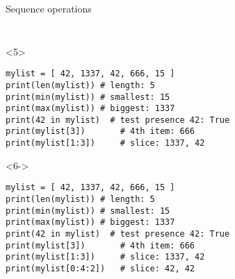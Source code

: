 \begin{frame}[fragile]{Sequence operations}
\begin{center}
\begin{columns}[onlytextwidth]
\begin{column}{\textwidth}
\begin{onlyenv}
\begin{lstlisting}[style=python,morekeywords={for, in, range, list}]
 \end{lstlisting}
      \end{onlyenv}

      \begin{onlyenv}<5>
        \begin{lstlisting}[style=python,morekeywords={for, in, range, list}]
mylist = [ 42, 1337, 42, 666, 15 ]
print(len(mylist)) # length: 5
print(min(mylist)) # smallest: 15
print(max(mylist)) # biggest: 1337
print(42 in mylist)  # test presence 42: True
print(mylist[3])       # 4th item: 666
print(mylist[1:3])     # slice: 1337, 42
 \end{lstlisting}
      \end{onlyenv}

      \begin{onlyenv}<6->
        \begin{lstlisting}[style=python,morekeywords={for, in, range, list}]
mylist = [ 42, 1337, 42, 666, 15 ]
print(len(mylist)) # length: 5
print(min(mylist)) # smallest: 15
print(max(mylist)) # biggest: 1337
print(42 in mylist)  # test presence 42: True
print(mylist[3])       # 4th item: 666
print(mylist[1:3])     # slice: 1337, 42
print(mylist[0:4:2])   # slice: 42, 42 \end{lstlisting}
      \end{onlyenv}

    \end{column}
  \end{columns}

  \end{center}

\end{frame}


